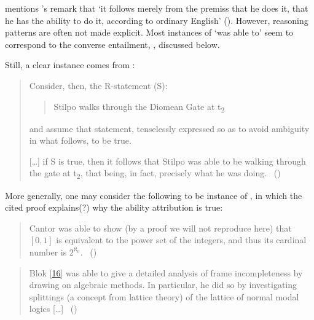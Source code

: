 \begin{note}
{    \textcite[1]{Boylan:2020aa} mentions \citeauthor{Austin:1961vz}'s  remark that `it follows merely from the premiss that he does it, that he has the ability to do it, according to ordinary English' (\citeyear[175]{Austin:1961vz}).
    However, reasoning patterns are often not made explicit.
    Most instances of `was able to' seem to correspond to the converse entailment, \BoyPSC{}, discussed below.

    Still, a clear instance comes from \textcite{Taylor:2011uh}:
    \begin{quote}
      Consider, then, the R-statement (S):

      \begin{quote}
        Stilpo walks through the Diomean Gate at t\textsubscript{2}
      \end{quote}

      and assume that statement, tenselessly expressed so as to avoid ambiguity in what follows, to be true.

      [\dots]
      if S is true, then it follows that Stilpo was able to be walking through the gate at t\textsubscript{2}, that being, in fact, precisely what he was doing.%
      \mbox{ }\hfill\mbox{(\cite[139--143]{Taylor:2011uh})}
    \end{quote}

    More generally, one may consider the following to be instance of \BoyPS{}, in which the cited proof explains(?) why the ability attribution is true:

    \begin{quote}
      Cantor was able to show (by a proof we will not reproduce here) that \([0, 1]\) is equivalent to the power set of the integers, and thus its cardinal number is \(2^{\aleph_{0}}\).\newline
      \mbox{ }\hfill\mbox{(\cite[65]{Partee:1990tu})}
    \end{quote}

    \begin{quote}
      Blok [\hyperlink{cite.Blok:1980th}{16}] was able to give a detailed analysis of frame incompleteness by drawing on algebraic methods.
      In particular, he did so by investigating splittings (a concept from lattice theory) of the lattice of normal modal logics [\dots]
      \mbox{ }\hfill\mbox{(\cite[74]{Blackburn:2007wa})}
    \end{quote}
  }
\end{note}


